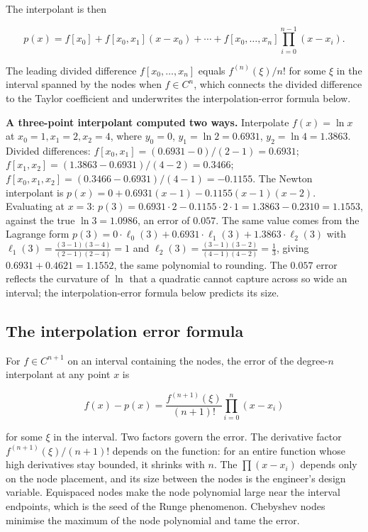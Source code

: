 The interpolant is then

\[
p(x) = f[x_{0}] + f[x_{0}, x_{1}](x - x_{0}) + \cdots
+ f[x_{0}, \ldots, x_{n}] \prod_{i=0}^{n-1}(x - x_{i}).
\]

The leading divided difference $f[x_{0}, \ldots, x_{n}]$ equals
$f^{(n)}(\xi)/n!$ for some $\xi$ in the interval spanned by the
nodes when $f \in C^{n}$, which connects the divided difference to
the Taylor coefficient and underwrites the interpolation-error
formula below.

\begin{example}
\textbf{A three-point interpolant computed two ways.} Interpolate
$f(x) = \ln x$ at $x_{0} = 1, x_{1} = 2, x_{2} = 4$, where $y_{0} =
0$, $y_{1} = \ln 2 = 0.6931$, $y_{2} = \ln 4 = 1.3863$. Divided
differences: $f[x_{0}, x_{1}] = (0.6931 - 0)/(2 - 1) = 0.6931$;
$f[x_{1}, x_{2}] = (1.3863 - 0.6931)/(4 - 2) = 0.3466$;
$f[x_{0}, x_{1}, x_{2}] = (0.3466 - 0.6931)/(4 - 1) = -0.1155$. The
Newton interpolant is $p(x) = 0 + 0.6931(x - 1) - 0.1155(x - 1)(x -
2)$. Evaluating at $x = 3$: $p(3) = 0.6931 \cdot 2 - 0.1155 \cdot 2
\cdot 1 = 1.3863 - 0.2310 = 1.1553$, against the true $\ln 3 =
1.0986$, an error of $0.057$. The same value comes from the
Lagrange form $p(3) = 0 \cdot \ell_{0}(3) + 0.6931 \cdot \ell_{1}(3)
+ 1.3863 \cdot \ell_{2}(3)$ with $\ell_{1}(3) = \frac{(3-1)(3-4)}
{(2-1)(2-4)} = 1$ and $\ell_{2}(3) = \frac{(3-1)(3-2)}{(4-1)(4-2)} =
\tfrac{1}{3}$, giving $0.6931 + 0.4621 = 1.1552$, the same
polynomial to rounding. The $0.057$ error reflects the curvature of
$\ln$ that a quadratic cannot capture across so wide an interval;
the interpolation-error formula below predicts its size.
\end{example}

\subsection{The interpolation error formula}

For $f \in C^{n+1}$ on an interval containing the nodes, the error
of the degree-$n$ interpolant at any point $x$ is

\[
f(x) - p(x) = \frac{f^{(n+1)}(\xi)}{(n+1)!}
\prod_{i=0}^{n}(x - x_{i})
\]

for some $\xi$ in the interval. Two factors govern the error. The
derivative factor $f^{(n+1)}(\xi)/(n+1)!$ depends on the function:
for an entire function whose high derivatives stay bounded, it
shrinks with $n$. The  $\prod(x - x_{i})$
depends only on the node placement, and its size between the nodes
is the engineer's design variable. Equispaced nodes make the node
polynomial large near the interval endpoints, which is the seed of
the Runge phenomenon. Chebyshev nodes minimise the maximum of the
node polynomial and tame the error.

